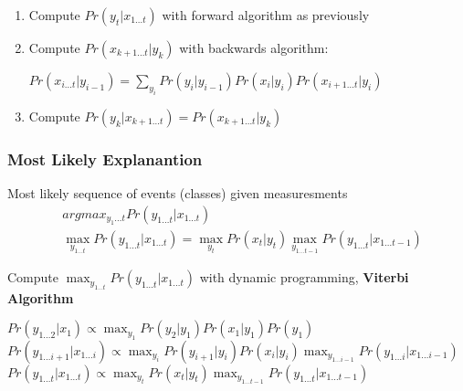 \documentclass[]{article}
\theoremstyle{definition}
\begin{document}
\begin{enumerate}
    \item Compute $Pr(y_t | x_{1 \ldots t})$ with forward algorithm as previously
    \item Compute $Pr(x_{k+1 \ldots t} | y_k)$ with backwards algorithm:

        \begin{algorithmic}
            \State $Pr(x_{i \ldots t} | y_{i-1}) = \sum_{y_{i}} Pr(y_{i} | y_{i-1}) Pr(x_i | y_i) Pr(x_{i+1 \ldots t} | y_i)$
            \EndFor
        \end{algorithmic}

    \item Compute $Pr(y_k | x_{k+1 \ldots t}) = Pr(x_{k+1 \ldots t} | y_k)$
\end{enumerate}

\subsubsection{Most Likely Explanantion}
\label{ssub:Most Likely Explanantion}

Most likely sequence of events (classes) given measuresments
\begin{align*}
    & argmax_{y_1 \ldots t} Pr(y_{1 \ldots t} | x_{1 \ldots t}) \\
    & \max_{y_{1 \ldots t}} Pr(y_{1 \ldots t} | x_{1 \ldots t}) = \max_{y_t} Pr(x_t | y_t) \max_{y_{1 \ldots t-1}} Pr(y_{1 \ldots t} | x_{1 \ldots t-1})
\end{align*}

Compute $\max_{y_{1 \ldots t}} Pr(y_{1 \ldots t}| x_{1 \ldots t})$ with dynamic programming, \textbf{Viterbi Algorithm}

\begin{algorithmic}
    \State $Pr(y_{1 \ldots 2} | x_1) \propto \max_{y_1} Pr(y_2 | y_1) Pr(x_1 | y_1) Pr(y_1) $
    \State $Pr(y_{1 \ldots i+1} | x_{1 \ldots i}) \propto \max_{y_i} Pr(y_{i+1} | y_i) Pr(x_i | y_i) \max_{y_{1 \ldots i-1}} Pr(y_{1 \ldots i} | x_{1 \ldots i-1}) $
    \EndFor
    \State $Pr(y_{1 \ldots t} | x_{1 \ldots t}) \propto \max_{y_t} Pr(x_t | y_t) \max_{y_{1 \ldots t-1}} Pr(y_{1 \ldots t} | x_{1 \ldots t-1}) $
\end{algorithmic}
\end{document}
